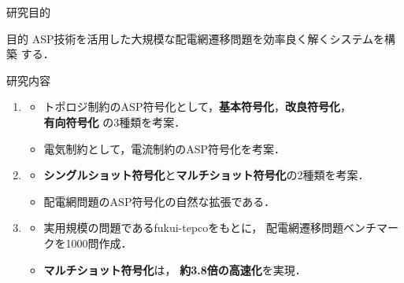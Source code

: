 \documentclass[dvipdfmx,11pt]{beamer}
\begin{document}
\begin{frame}{研究目的}
  \begin{alertblock}{目的}
   ASP技術を活用した大規模な配電網遷移問題を効率良く解くシステムを構築
   する．
  \end{alertblock}
  \vfill
 \begin{block}{研究内容}
  \begin{enumerate}
   \item {}
         \begin{itemize}
          \item トポロジ制約のASP符号化として，\textbf{基本符号化}，\textbf{改良符号化}，
                \\ \alert{\bf 有向符号化} の3種類を考案．
          \item 電気制約として，電流制約のASP符号化を考案．
         \end{itemize}
   \item {}
         \begin{itemize}
          \item \textbf{シングルショット符号化}と\alert{\bf マルチショット符号化}の2種類を考案．
          \item 配電網問題のASP符号化の自然な拡張である．
         \end{itemize}
   \item {}
         \begin{itemize}
          \item 実用規模の問題である\textsf{fukui-tepco}をもとに，
                配電網遷移問題ベンチマークを1000問作成．
          \item \textbf{マルチショット符号化}は，
                \alert{\bf 約3.8倍の高速化}を実現．
         \end{itemize}
  \end{enumerate}
 \end{block}
\end{frame}
\begin{frame}{~}
 \LARGE \centering
\end{frame}
%
\end{document}
